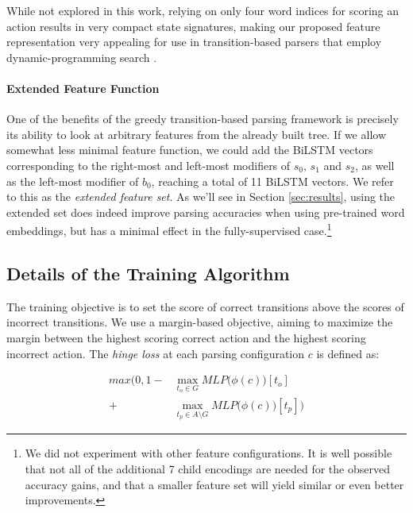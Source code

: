 \documentclass[11pt]{article}
\begin{document}
While not explored in this work, relying on only four word indices for scoring
an action results in
very compact state signatures, making our proposed feature representation 
very appealing for use in transition-based parsers that employ dynamic-programming search \cite{huang-sagae:2010:ACL,kuhlmann2011}.

\paragraph{Extended Feature Function}
One of the benefits of the greedy transition-based parsing framework is
precisely its ability to look at arbitrary features from the already built tree.
If we allow somewhat less minimal feature function, we could add the \mbox{BiLSTM}
vectors corresponding to the right-most and left-most modifiers of $s_0$, $s_1$
and $s_2$, as well as the left-most modifier of $b_0$,
reaching a total of 11 \mbox{BiLSTM} vectors. We
refer to this as the \emph{extended feature set}. As we'll see in Section
\ref{sec:results}, using the extended set does indeed improve parsing accuracies when using
pre-trained word embeddings, but has a minimal effect in the fully-supervised
case.\footnote{We did not experiment with other feature configurations. It is well possible that not all of the additional 7 child encodings are needed for the observed accuracy gains, and that a smaller feature set will yield similar or even better improvements.}

\subsection{Details of the Training Algorithm}
The training objective is to set the score of correct transitions above the
scores of incorrect transitions.
We use a margin-based objective, aiming to
maximize the margin between the highest scoring correct action and the highest
scoring incorrect action. The \emph{hinge loss} at each parsing configuration
$c$ is defined as:
    \vspace{-1em}
\begin{center}
\begin{align*}
max\Big( 0, 1 -& \max_{t_o \in G}MLP\big(\phi(c)\big)[t_o]  \\
           +& \max_{t_p \in A\setminus G}MLP\big(\phi(c)\big)[t_p]  \Big)
\end{align*}

\end{center}
\end{document}
